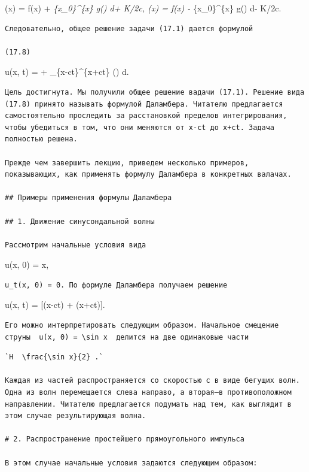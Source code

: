 \documentclass[
  ukrainian,
]{article}
\begin{document}
\psi(x) =  f(x) +  \int\emph{\{x\_0\}\^{}\{x\}
g(\xi) d\xi + K/2c, \varphi(x) =  f(x) - 
\int}\{x\_0\}\^{}\{x\} g(\xi) d\xi - K/2c.

\begin{verbatim}
Следовательно, общее решение задачи (17.1) дается формулой

(17.8)
\end{verbatim}

u(x, t) =  \left[ f(x-ct) + f(x+ct) \right] + 
\int\_\{x-ct\}\^{}\{x+ct\} (\xi) d\xi.

\begin{verbatim}
Цель достигнута. Мы получили общее решение вадачи (17.1). Решение вида (17.8) принято называть формулой Даламбера. Читателю предлагается самостоятельно проследить за расстановкой пределов интегрирования, чтобы убедиться в том, что они меняются от x-ct до x+ct. Задача полностью решена.

Прежде чем завершить лекцию, приведем несколько примеров, показывающих, как применять формулу Даламбера в конкретных валачах.

## Примеры применения формулы Даламбера

## 1. Движение синусондальной волны

Рассмотрим начальные условия вида
\end{verbatim}

u(x, 0) = \sin x,

\begin{verbatim}
u_t(x, 0) = 0. По формуле Даламбера получаем решение
\end{verbatim}

u(x, t) =  {[}\sin(x-ct) + \sin(x+ct){]}.

\begin{verbatim}
Его можно интерпретировать следующим образом. Начальное смещение струны  u(x, 0) = \sin x  делится на две одинаковые части
\end{verbatim}


\begin{verbatim}
`H  \frac{\sin x}{2} .`

Каждая из частей распространяется со скоростью с в виде бегущих волн. Одна из волн перемещается слева направо, а вторая—в противоположном направлении. Читателю предлагается подумать над тем, как выглядит в этом случае результирующая волна.

# 2. Распространение простейшего прямоугольного импульса

В этом случае начальные условия задаются следующим образом:
\end{verbatim}
\end{document}
